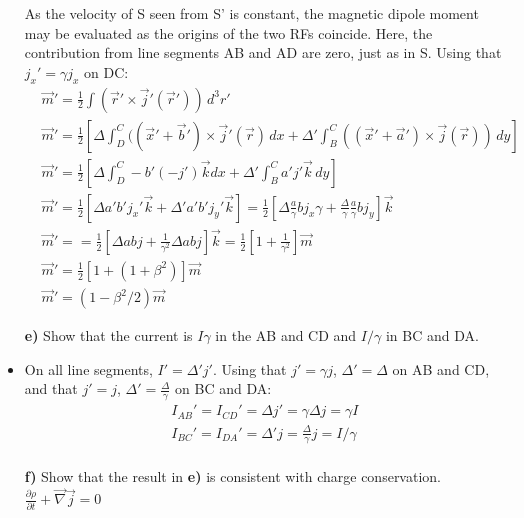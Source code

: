 \documentclass[11pt,a4paper]{report}
\newcounter{excount}[chapter]
\newenvironment{exercise}[1][]{\addtocounter{excount}{1} \noindent {\bf Problem
    \arabic{excount} \ \ #1}\hspace{2mm}}{\vspace{4mm}}
\begin{document}
\begin{exercise}
\begin{itemize}
As the velocity of S seen from S' is constant, the magnetic dipole moment may be evaluated as the origins of the two RFs coincide. Here, the contribution from line segments AB and AD are zero, just as in S. Using that $j_x'=\gamma j_x$ on DC:
\begin{align*}
&\vec m'=\frac{1}{2}\int(\vec r' \times \vec j'(\vec r'))\,d^3r' \\
&\vec m' = \frac{1}{2} \left[\Delta \int_D^C((\vec x' + \vec b' )\times \vec j'(\vec r)\,dx + \Delta'\int_B^C((\vec x'+\vec a' )\times \vec j(\vec r))\,dy  \right] \\
&\vec m' = \frac{1}{2} \left[\Delta \int_D^C -b'(-j') \vec k dx + \Delta'\int_B^C a'j' \vec k \,dy  \right] \\
&\vec m' = \frac{1}{2} \left[\Delta  a'b'j_x' \vec k  +  \Delta ' a'b'j_y' \vec k  \right]  = \frac{1}{2} \left[\Delta  \frac{a}{\gamma} b j_x\gamma  +  \frac{\Delta}{\gamma}\frac{a}{\gamma} b j_y   \right] \vec k \\
&\vec m'= =\frac{1}{2}\left[ \Delta abj+ \frac{1}{\gamma^2} \Delta abj \right] \vec k = \frac{1}{2}\left[ 1+ \frac{1}{\gamma^2}  \right] \vec m \\
&\vec m' = \frac{1}{2}\left[ 1+  (1+ \beta^2  ) \right] \vec m \\
&\vec m'=(1-\beta^2/2)\vec m
\end{align*}
\item[{\bf e)}]Show that the current  is $I\gamma$ in the AB and CD and $I/\gamma$ in BC and DA.
\item On all line segments, $I'=\Delta' j'$. Using that $j'=\gamma j$, $\Delta'=\Delta$ on AB and CD, and that $j'=j$, $\Delta'=\frac{\Delta}{\gamma}$ on BC and DA:
\begin{align*}
I_{AB}'=I_{CD}'=\Delta j'= \gamma \Delta j = \gamma I \\
I_{BC}'=I_{DA}'=\Delta' j = \frac{\Delta}{\gamma} j =  I/\gamma \\
\end{align*}
\item[{\bf f)}]Show that the result in {\bf e)} is consistent with charge conservation.
$\frac{\partial \rho}{\partial t}+\vec \nabla \vec j=0$
\end{itemize}
\end{exercise}
\end{document}
